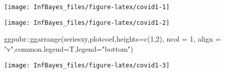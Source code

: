 \documentclass[
]{book}
\newenvironment{Shaded}{\begin{snugshade}}{\end{snugshade}}
\newcommand{\AttributeTok}[1]{\textcolor[rgb]{0.77,0.63,0.00}{#1}}
\newcommand{\DecValTok}[1]{\textcolor[rgb]{0.00,0.00,0.81}{#1}}
\newcommand{\FloatTok}[1]{\textcolor[rgb]{0.00,0.00,0.81}{#1}}
\newcommand{\FunctionTok}[1]{\textcolor[rgb]{0.00,0.00,0.00}{#1}}
\newcommand{\NormalTok}[1]{#1}
\newcommand{\OtherTok}[1]{\textcolor[rgb]{0.56,0.35,0.01}{#1}}
\newcommand{\SpecialCharTok}[1]{\textcolor[rgb]{0.00,0.00,0.00}{#1}}
\newcommand{\StringTok}[1]{\textcolor[rgb]{0.31,0.60,0.02}{#1}}
\begin{document}
\begin{center}\texttt{[image: InfBayes\_files/figure-latex/covid1-1]} \end{center}

\begin{Shaded}
\end{Shaded}

\begin{center}\texttt{[image: InfBayes\_files/figure-latex/covid1-2]} \end{center}

\begin{Shaded}
\begin{Highlighting}[]
\NormalTok{ggpubr}\SpecialCharTok{::}\FunctionTok{ggarrange}\NormalTok{(seriesxy,plotcoef,}\AttributeTok{heights=}\FunctionTok{c}\NormalTok{(}\DecValTok{1}\NormalTok{,}\DecValTok{2}\NormalTok{),}
          \AttributeTok{ncol =} \DecValTok{1}\NormalTok{, }\AttributeTok{align =} \StringTok{"v"}\NormalTok{,}\AttributeTok{common.legend=}\NormalTok{T,}\AttributeTok{legend=}\StringTok{"bottom"}\NormalTok{)}
\end{Highlighting}
\end{Shaded}

\begin{center}\texttt{[image: InfBayes\_files/figure-latex/covid1-3]} \end{center}

\begin{Shaded}
\end{Shaded}
\end{document}
